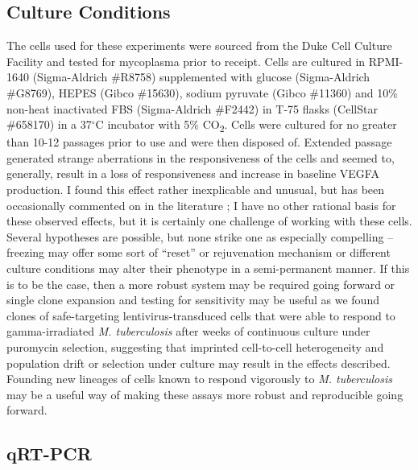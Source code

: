 \subsection{Culture Conditions}\label{thp1culture}

The cells used for these experiments were sourced from the Duke Cell Culture Facility and tested for mycoplasma prior to receipt. Cells are cultured in RPMI\hyp{}1640 (Sigma\hyp{}Aldrich \#R8758) supplemented with glucose (Sigma\hyp{}Aldrich \#G8769), HEPES (Gibco \#15630), sodium pyruvate (Gibco \#11360) and 10\% non\hyp{}heat inactivated FBS (Sigma\hyp{}Aldrich \#F2442) in T\hyp{}75 flasks (CellStar \#658170) in a 37$^{\circ}$C incubator with 5\% CO\textsubscript{2}. Cells were cultured for no greater than 10\hyp{}12 passages prior to use and were then disposed of. Extended passage generated strange aberrations in the responsiveness of the cells and seemed to, generally, result in a loss of responsiveness and increase in baseline VEGFA production. I found this effect rather inexplicable and unusual, but has been occasionally commented on in the literature \citep{An2009, Chanput2015, Gazova2020, Lund2016, Stokes1999}; I have no other rational basis for these observed effects, but it is certainly one challenge of working with these cells. Several hypotheses are possible, but none strike one as especially compelling -- freezing may offer some sort of ``reset'' or rejuvenation mechanism or different culture conditions may alter their phenotype in a semi\hyp{}permanent manner. If this is to be the case, then a more robust system may be required going forward or single clone expansion and testing for sensitivity may be useful as we found clones of safe-targeting lentivirus-transduced cells that were able to respond to gamma-irradiated \textit{M. tuberculosis} after weeks of continuous culture under puromycin selection, suggesting that imprinted cell-to-cell heterogeneity and population drift or selection under culture may result in the effects described. Founding new lineages of cells known to respond vigorously to \textit{M. tuberculosis} may be a useful way of making these assays more robust and reproducible going forward.

\subsection{qRT\hyp{}PCR}\label{qrtpcr}

